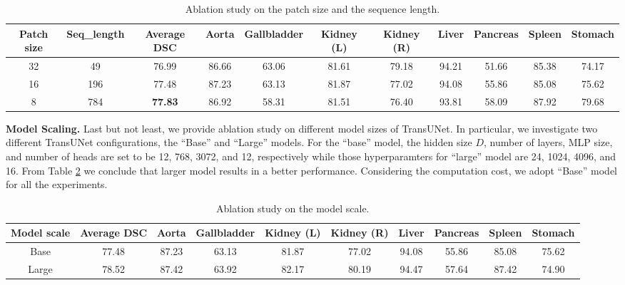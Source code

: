 \documentclass[runningheads]{llncs}
\begin{document}
\vspace{-1em}
\begin{table}[]
\centering
\footnotesize
\resizebox{\textwidth}{!}
{
\begin{tabular}{c|c|c|cccccccc}
\hline
Patch size   & Seq\_length       & Average DSC    & Aorta & Gallbladder & Kidney (L) & Kidney (R) & Liver & Pancreas & Spleen & Stomach \\ \hline
32 & 49   & 76.99 & 86.66 & 63.06       & 81.61      & 79.18      & 94.21 & 51.66    & 85.38  & 74.17   \\ 
16  & 196 & 77.48 & 87.23 & 63.13       & 81.87      & 77.02      & 94.08 & 55.86    & 85.08  & 75.62   \\
8  & 784 & \textbf{77.83} & 86.92 & 58.31       & 81.51      & 76.40      & 93.81 & 58.09    & 87.92  & 79.68   \\ \hline
\end{tabular}
} %
\caption{Ablation study on the patch size and the sequence length.
\vspace{-0.5em}}
\label{tab:ps}
\end{table}

\vspace{-1.5em}
\noindent\textbf{Model Scaling.}
Last but not least, we provide ablation study on different model sizes of TransUNet. 
In particular, we investigate two different TransUNet configurations, the ``Base'' and ``Large'' models. For the ``base'' model, the hidden size $D$, number of layers, MLP size, and number of heads are set to be 12, 768, 3072, and 12, respectively while those hyperparamters for ``large'' model are 24, 1024, 4096, and 16. From Table \ref{tab:scale} we conclude that larger model results in a better performance. Considering the computation cost, we adopt ``Base'' model for all the experiments.

\vspace{-1em}
\begin{table}[]
\footnotesize
\centering
\resizebox{\textwidth}{!}
{
\begin{tabular}{c|c|cccccccc}
\hline
Model scale          & Average DSC    & Aorta & Gallbladder & Kidney (L) & Kidney (R) & Liver & Pancreas & Spleen & Stomach \\ \hline
Base   & 77.48 & 87.23 & 63.13       & 81.87      & 77.02      & 94.08 & 55.86    & 85.08  & 75.62   \\
Large & 78.52 & 87.42 & 63.92       & 82.17      & 80.19      & 94.47 & 57.64    & 87.42  & 74.90   \\ \hline
\end{tabular}
}
\caption{Ablation study on the model scale.}
\label{tab:scale}
\end{table}
\end{document}
